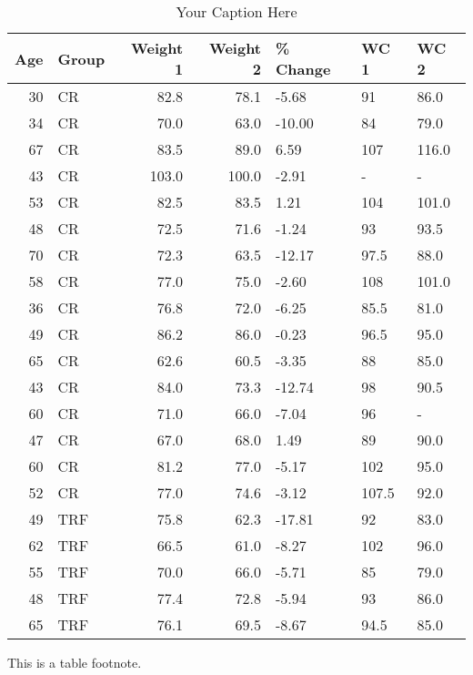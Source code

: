 \begin{table}[ht]
\centering
\caption{Your Caption Here}
\label{TablaPorce}
\begin{tabular}{rlrrlll}
\toprule
 Age & Group &  Weight 1 &  Weight 2 &  \% Change &   WC 1 &   WC 2 \\
\midrule
 30 &    CR &      82.8 &      78.1 &  -5.68 &     91 &   86.0 \\
 34 &    CR &      70.0 &      63.0 & -10.00 &     84 &   79.0 \\
 67 &    CR &      83.5 &      89.0 &   6.59 &    107 &  116.0 \\
 43 &    CR &     103.0 &     100.0 &  -2.91 &      - &      - \\
 53 &    CR &      82.5 &      83.5 &   1.21 &    104 &  101.0 \\
 48 &    CR &      72.5 &      71.6 &  -1.24 &     93 &   93.5 \\
 70 &    CR &      72.3 &      63.5 & -12.17 &   97.5 &   88.0 \\
 58 &    CR &      77.0 &      75.0 &  -2.60 &    108 &  101.0 \\
 36 &    CR &      76.8 &      72.0 &  -6.25 &   85.5 &   81.0 \\
 49 &    CR &      86.2 &      86.0 &  -0.23 &   96.5 &   95.0 \\
 65 &    CR &      62.6 &      60.5 &  -3.35 &     88 &   85.0 \\
 43 &    CR &      84.0 &      73.3 & -12.74 &     98 &   90.5 \\
 60 &    CR &      71.0 &      66.0 &  -7.04 &     96 &      - \\
 47 &    CR &      67.0 &      68.0 &   1.49 &     89 &   90.0 \\
 60 &    CR &      81.2 &      77.0 &  -5.17 &    102 &   95.0 \\
 52 &    CR &      77.0 &      74.6 &  -3.12 &  107.5 &   92.0 \\
 49 &   TRF &      75.8 &      62.3 & -17.81 &     92 &   83.0 \\
 62 &   TRF &      66.5 &      61.0 &  -8.27 &    102 &   96.0 \\
 55 &   TRF &      70.0 &      66.0 &  -5.71 &     85 &   79.0 \\
 48 &   TRF &      77.4 &      72.8 &  -5.94 &     93 &   86.0 \\
 65 &   TRF &      76.1 &      69.5 &  -8.67 &   94.5 &   85.0 \\
\bottomrule
\end{tabular}
\footnotesize{This is a table footnote.}
\end{table}

